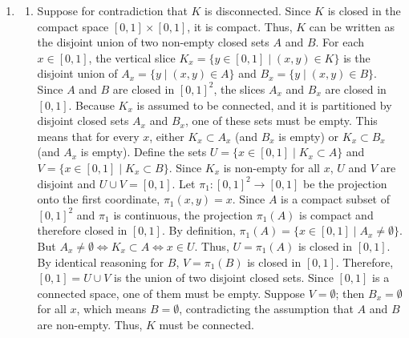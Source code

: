 \documentclass{article}
\begin{document}
\begin{enumerate}[label=\fbox{\arabic*}]
  \item %
        \begin{enumerate}[label=(\arabic*)]
          \item Suppose for contradiction that $K$ is disconnected. Since $K$ is closed in the compact space $[0,1] \times [0,1]$, it is compact. Thus, $K$ can be written as the disjoint union of two non-empty closed sets $A$ and $B$.
          For each $x \in [0, 1]$, the vertical slice $K_x = \{ y \in [0, 1] \mid (x, y) \in K \}$ is the disjoint union of $A_x = \{ y \mid (x, y) \in A \}$ and $B_x = \{ y \mid (x, y) \in B \}$.
          Since $A$ and $B$ are closed in $[0,1]^2$, the slices $A_x$ and $B_x$ are closed in $[0,1]$. Because $K_x$ is assumed to be connected, and it is partitioned by disjoint closed sets $A_x$ and $B_x$, one of these sets must be empty.
          This means that for every $x$, either $K_x \subset A_x$ (and $B_x$ is empty) or $K_x \subset B_x$ (and $A_x$ is empty).
          Define the sets $U = \{ x \in [0, 1] \mid K_x \subset A \}$ and $V = \{ x \in [0, 1] \mid K_x \subset B \}$. Since $K_x$ is non-empty for all $x$, $U$ and $V$ are disjoint and $U \cup V = [0, 1]$.
          Let $\pi_1: [0, 1]^2 \to [0, 1]$ be the projection onto the first coordinate, $\pi_1(x, y) = x$. 
          Since $A$ is a compact subset of $[0, 1]^2$ and $\pi_1$ is continuous, the projection $\pi_1(A)$ is compact and therefore closed in $[0, 1]$. 
          By definition, $\pi_1(A) = \{ x \in [0, 1] \mid A_x \neq \emptyset \}$. But $A_x \neq \emptyset \iff K_x \subset A \iff x \in U$. Thus, $U = \pi_1(A)$ is closed in $[0,1]$.
          By identical reasoning for $B$, $V = \pi_1(B)$ is closed in $[0,1]$.
          Therefore, $[0, 1] = U \cup V$ is the union of two disjoint closed sets. Since $[0, 1]$ is a connected space, one of them must be empty. Suppose $V = \emptyset$; then $B_x = \emptyset$ for all $x$, which means $B = \emptyset$, contradicting the assumption that $A$ and $B$ are non-empty. 
          Thus, $K$ must be connected.
          

\end{enumerate}
\end{enumerate}
\end{document}
